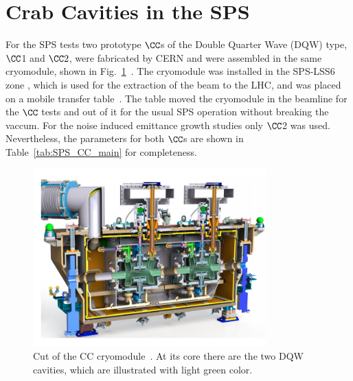 \section{Crab Cavities in the SPS}\label{sec:CC_SPS_setup}

For the SPS tests two prototype $\CC$s of the Double Quarter Wave (DQW) type, $\CC$1 and $\CC2$, were fabricated by CERN and were assembled in the same cryomodule, shown in Fig.~\ref{fig:DQW_cryomodule}~\cite{Zanoni:2017}. The cryomodule was installed in the SPS-LSS6 zone %
, which is used for the extraction of the beam to the LHC, and was placed on a mobile transfer table~\cite{Calaga:2649807}. The table moved the cryomodule in the beamline for the $\CC$ tests and out of it for the usual SPS operation without breaking the vaccum. For the noise induced emittance growth studies only $\CC$2 was used. Nevertheless, the parameters for both $\CC$s are shown in Table~\ref{tab:SPS_CC_main} for completeness.


\begin{figure}[h]
   \centering         
   \includegraphics[width=0.8\textwidth]{images/Ch4/CC_cryomodule.png}
       \caption{Cut of the CC cryomodule~\cite{Zanoni:2017}. At its core there are the two DQW cavities, which are illustrated with light green color.}
       \label{fig:DQW_cryomodule}
\end{figure}


